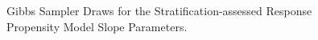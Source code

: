 \documentclass[12pt]{article}
\makeatletter
\def\fixFloatSize#1{}%
\makeatother
\begin{document}
\begin{appendices}
\bgroup
\fixFloatSize{images/GibbsDesigns.png}
\begin{figure}[!htbp]
\centering \makeatletter{}
\makeatother 
\caption{{Gibbs Sampler Draws for the Stratification-assessed Response Propensity Model Slope Parameters.}}
\label{fig-gibbs-response-criterion}
\end{figure}
\egroup

\end{appendices}

\clearpage




\end{document}
